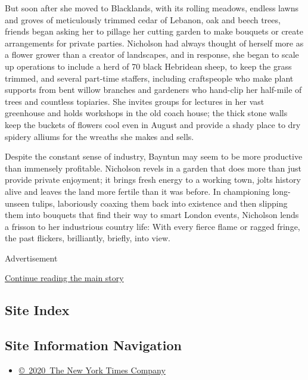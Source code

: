 But soon after she moved to Blacklands, with its rolling meadows,
endless lawns and groves of meticulously trimmed cedar of Lebanon, oak
and beech trees, friends began asking her to pillage her cutting garden
to make bouquets or create arrangements for private parties. Nicholson
had always thought of herself more as a flower grower than a creator of
landscapes, and in response, she began to scale up operations to include
a herd of 70 black Hebridean sheep, to keep the grass trimmed, and
several part-time staffers, including craftspeople who make plant
supports from bent willow branches and gardeners who hand-clip her
half-mile of trees and countless topiaries. She invites groups for
lectures in her vast greenhouse and holds workshops in the old coach
house; the thick stone walls keep the buckets of flowers cool even in
August and provide a shady place to dry spidery alliums for the wreaths
she makes and sells.

Despite the constant sense of industry, Bayntun may seem to be more
productive than immensely profitable. Nicholson revels in a garden that
does more than just provide private enjoyment; it brings fresh energy to
a working town, jolts history alive and leaves the land more fertile
than it was before. In championing long-unseen tulips, laboriously
coaxing them back into existence and then slipping them into bouquets
that find their way to smart London events, Nicholson lends a frisson to
her industrious country life: With every fierce flame or ragged fringe,
the past flickers, brilliantly, briefly, into view.

Advertisement

\protect\hyperlink{after-bottom}{Continue reading the main story}

\hypertarget{site-index}{%
\subsection{Site Index}\label{site-index}}

\hypertarget{site-information-navigation}{%
\subsection{Site Information
Navigation}\label{site-information-navigation}}

\begin{itemize}
\tightlist
\item
  \href{https://help.nytimes3xbfgragh.onion/hc/en-us/articles/115014792127-Copyright-notice}{©~2020~The
  New York Times Company}
\end{itemize}


